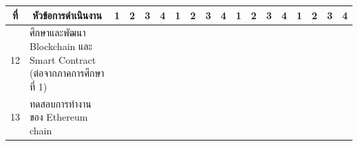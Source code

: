 \documentclass[12pt,oneside,openright,a4paper]{cpe-thai-project}
\begin{document}
\begin{table}[]
{\begin{tabular}{|llllllllllllllllll|}
\multicolumn{1}{|c|}{\multirow{-3}{*}{ที่}} & \multicolumn{1}{c|}{\multirow{-3}{*}{หัวข้อการดำเนินงาน}}                                 & \multicolumn{1}{c|}{1}                        & \multicolumn{1}{c|}{2}                        & \multicolumn{1}{c|}{3}                        & \multicolumn{1}{c|}{4}                        & \multicolumn{1}{c|}{1}                        & \multicolumn{1}{c|}{2}                        & \multicolumn{1}{c|}{3}                        & \multicolumn{1}{c|}{4}                        & \multicolumn{1}{c|}{1}                        & \multicolumn{1}{c|}{2}                        & \multicolumn{1}{c|}{3}                        & \multicolumn{1}{c|}{4}                        & \multicolumn{1}{c|}{1}                        & \multicolumn{1}{c|}{2}                        & \multicolumn{1}{c|}{3}                        & \multicolumn{1}{c|}{4}   \\ \hline
\multicolumn{1}{|l|}{12}                    & \multicolumn{1}{l|}{ศึกษาและพัฒนา Blockchain และ Smart Contract (ต่อจากภาคการศึกษาที่ 1)} & \multicolumn{1}{l|}{\cellcolor[HTML]{2D8C9F}} & \multicolumn{1}{l|}{\cellcolor[HTML]{2D8C9F}} & \multicolumn{1}{l|}{\cellcolor[HTML]{2D8C9F}} & \multicolumn{1}{l|}{\cellcolor[HTML]{2D8C9F}} & \multicolumn{1}{l|}{\cellcolor[HTML]{2D8C9F}} & \multicolumn{1}{l|}{\cellcolor[HTML]{2D8C9F}} & \multicolumn{1}{l|}{\cellcolor[HTML]{2D8C9F}} & \multicolumn{1}{l|}{\cellcolor[HTML]{2D8C9F}} & \multicolumn{1}{l|}{\cellcolor[HTML]{2D8C9F}} & \multicolumn{1}{l|}{\cellcolor[HTML]{2D8C9F}} & \multicolumn{1}{l|}{\cellcolor[HTML]{2D8C9F}} & \multicolumn{1}{l|}{\cellcolor[HTML]{2D8C9F}} & \multicolumn{1}{l|}{\cellcolor[HTML]{2D8C9F}} & \multicolumn{1}{l|}{\cellcolor[HTML]{2D8C9F}} & \multicolumn{1}{l|}{\cellcolor[HTML]{2D8C9F}} & \cellcolor[HTML]{2D8C9F} \\ \hline
\multicolumn{1}{|l|}{13}                    & \multicolumn{1}{l|}{ทดสอบการทำงานของ Ethereum chain}                                      & \multicolumn{1}{l|}{\cellcolor[HTML]{2D8C9F}} & \multicolumn{1}{l|}{\cellcolor[HTML]{2D8C9F}} & \multicolumn{1}{l|}{\cellcolor[HTML]{2D8C9F}} & \multicolumn{1}{l|}{\cellcolor[HTML]{2D8C9F}} & \multicolumn{1}{l|}{\cellcolor[HTML]{2D8C9F}} & \multicolumn{1}{l|}{\cellcolor[HTML]{2D8C9F}} & \multicolumn{1}{l|}{\cellcolor[HTML]{2D8C9F}} & \multicolumn{1}{l|}{\cellcolor[HTML]{2D8C9F}} & \multicolumn{1}{l|}{\cellcolor[HTML]{2D8C9F}} & \multicolumn{1}{l|}{\cellcolor[HTML]{2D8C9F}} & \multicolumn{1}{l|}{\cellcolor[HTML]{2D8C9F}} & \multicolumn{1}{l|}{\cellcolor[HTML]{2D8C9F}} & \multicolumn{1}{l|}{\cellcolor[HTML]{2D8C9F}} & \multicolumn{1}{l|}{\cellcolor[HTML]{2D8C9F}} & \multicolumn{1}{l|}{\cellcolor[HTML]{2D8C9F}} & \cellcolor[HTML]{2D8C9F} \\ \hline

\end{tabular}}
\end{table}
\end{document}
